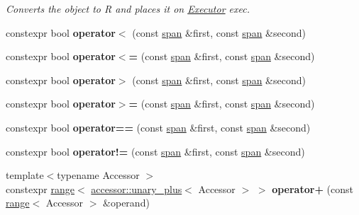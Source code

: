 \begin{DoxyCompactItemize}
\begin{DoxyCompactList}\small\item\em Converts the object to R and places it on \hyperlink{classgko_1_1Executor}{Executor} exec. \end{DoxyCompactList}\item 
\mbox{\label{namespacegko_a22cd8a74bb04c04ba81d88de0d0677b2}} 
constexpr bool {\bfseries operator$<$} (const \hyperlink{structgko_1_1span}{span} \&first, const \hyperlink{structgko_1_1span}{span} \&second)
\item 
\mbox{\label{namespacegko_aece8127f67d50be468da56463320819f}} 
constexpr bool {\bfseries operator$<$=} (const \hyperlink{structgko_1_1span}{span} \&first, const \hyperlink{structgko_1_1span}{span} \&second)
\item 
\mbox{\label{namespacegko_abfec3871dd48b1b7abd345404fc5fea4}} 
constexpr bool {\bfseries operator$>$} (const \hyperlink{structgko_1_1span}{span} \&first, const \hyperlink{structgko_1_1span}{span} \&second)
\item 
\mbox{\label{namespacegko_af6a579660b1a1d65b353ede9ab691730}} 
constexpr bool {\bfseries operator$>$=} (const \hyperlink{structgko_1_1span}{span} \&first, const \hyperlink{structgko_1_1span}{span} \&second)
\item 
\mbox{\label{namespacegko_afa4fd5d9324b20d7205d3cc6ab610444}} 
constexpr bool {\bfseries operator==} (const \hyperlink{structgko_1_1span}{span} \&first, const \hyperlink{structgko_1_1span}{span} \&second)
\item 
\mbox{\label{namespacegko_a76b572cdf444e58282049b6eeed87f0a}} 
constexpr bool {\bfseries operator!=} (const \hyperlink{structgko_1_1span}{span} \&first, const \hyperlink{structgko_1_1span}{span} \&second)
\item 
\mbox{\label{namespacegko_ac794f6c0cb0e1252d2326feebae6ba56}} 
{\footnotesize template$<$typename Accessor $>$ }\\constexpr \hyperlink{classgko_1_1range}{range}$<$ \hyperlink{structgko_1_1accessor_1_1unary__plus}{accessor\+::unary\+\_\+plus}$<$ Accessor $>$ $>$ {\bfseries operator+} (const \hyperlink{classgko_1_1range}{range}$<$ Accessor $>$ \&operand)

\end{DoxyCompactItemize}
